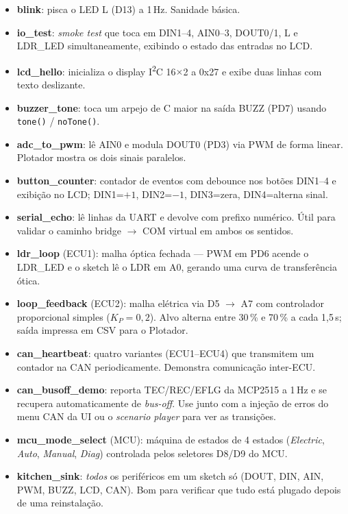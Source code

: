 \documentclass[12pt,a4paper]{article}
\begin{document}
\begin{itemize}[nosep]
  \item \textbf{blink}: pisca o LED L (D13) a 1\,Hz. Sanidade básica.
  \item \textbf{io\_test}: \emph{smoke test} que toca em DIN1--4,
        AIN0--3, DOUT0/1, L e LDR\_LED simultaneamente, exibindo o
        estado das entradas no LCD.
  \item \textbf{lcd\_hello}: inicializa o display I\textsuperscript{2}C
        16$\times$2 a 0x27 e exibe duas linhas com texto deslizante.
  \item \textbf{buzzer\_tone}: toca um arpejo de C maior na saída
        BUZZ (PD7) usando \texttt{tone()} / \texttt{noTone()}.
  \item \textbf{adc\_to\_pwm}: lê AIN0 e modula DOUT0 (PD3) via PWM
        de forma linear. Plotador mostra os dois sinais paralelos.
  \item \textbf{button\_counter}: contador de eventos com debounce
        nos botões DIN1--4 e exibição no LCD; DIN1=$+1$, DIN2=$-1$,
        DIN3=zera, DIN4=alterna sinal.
  \item \textbf{serial\_echo}: lê linhas da UART e devolve com
        prefixo numérico. Útil para validar o caminho bridge $\to$
        COM virtual em ambos os sentidos.
  \item \textbf{ldr\_loop} (ECU1): malha óptica fechada --- PWM em
        PD6 acende o LDR\_LED e o sketch lê o LDR em A0, gerando
        uma curva de transferência ótica.
  \item \textbf{loop\_feedback} (ECU2): malha elétrica via D5
        $\to$ A7 com controlador proporcional simples ($K_P = 0,2$).
        Alvo alterna entre 30\,\% e 70\,\% a cada 1,5\,s; saída
        impressa em CSV para o Plotador.
  \item \textbf{can\_heartbeat}: quatro variantes (ECU1--ECU4) que
        transmitem um contador na CAN periodicamente. Demonstra
        comunicação inter-ECU.
  \item \textbf{can\_busoff\_demo}: reporta TEC/REC/EFLG da MCP2515
        a 1\,Hz e se recupera automaticamente de \emph{bus-off}.
        Use junto com a injeção de erros do menu CAN da UI ou o
        \emph{scenario player} para ver as transições.
  \item \textbf{mcu\_mode\_select} (MCU): máquina de estados de 4
        estados (\emph{Electric}, \emph{Auto}, \emph{Manual},
        \emph{Diag}) controlada pelos seletores D8/D9 do MCU.
  \item \textbf{kitchen\_sink}: \emph{todos} os periféricos em um
        sketch só (DOUT, DIN, AIN, PWM, BUZZ, LCD, CAN). Bom para
        verificar que tudo está plugado depois de uma reinstalação.
\end{itemize}
\end{document}
